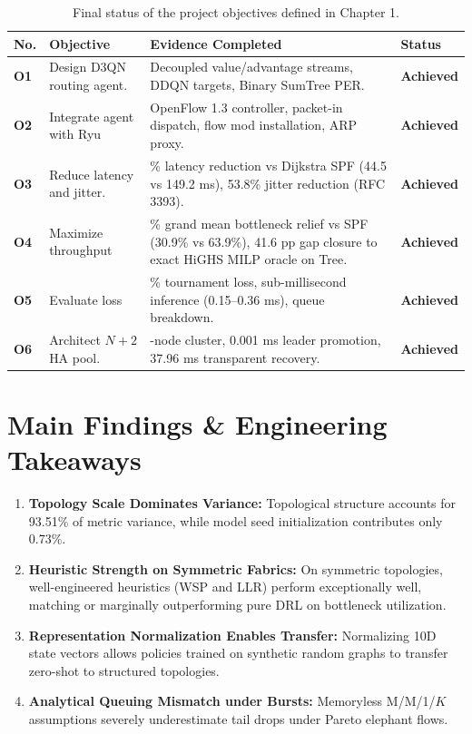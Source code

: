 \documentclass[12pt,a4paper,oneside]{report}
\begin{document}
\begin{table}[htbp]
\centering
\small
\caption{Final status of the project objectives defined in Chapter 1.}
\label{tab:objectives_status}
\begin{tabularx}{\textwidth}{>{\bfseries}p{10mm}>{\raggedright\arraybackslash}p{48mm}>{\raggedright\arraybackslash}X>{\bfseries}p{18mm}}
\toprule
No. & Objective & Evidence Completed & Status \\
\midrule
O1 & Design D3QN routing agent. & Decoupled value/advantage streams, DDQN targets, Binary SumTree PER. & Achieved \\
O2 & Integrate agent with Ryu & OpenFlow 1.3 controller, packet-in dispatch, flow mod installation, ARP proxy. & Achieved \\
O3 & Reduce latency and jitter. & 70.2\% latency reduction vs Dijkstra SPF (44.5 vs 149.2 ms), 53.8\% jitter reduction (RFC 3393). & Achieved \\
O4 & Maximize throughput & 51.7\% grand mean bottleneck relief vs SPF (30.9\% vs 63.9\%), 41.6 pp gap closure to exact HiGHS MILP oracle on Tree. & Achieved \\
O5 & Evaluate loss & 0.00\% tournament loss, sub-millisecond inference (0.15--0.36 ms), queue breakdown. & Achieved \\
O6 & Architect $N+2$ HA pool. & 3-node cluster, 0.001 ms leader promotion, 37.96 ms transparent recovery. & Achieved \\
\bottomrule
\end{tabularx}
\end{table}

\section{Main Findings \& Engineering Takeaways}
\begin{enumerate}
  \item \textbf{Topology Scale Dominates Variance:} Topological structure accounts for 93.51\% of metric variance, while model seed initialization contributes only 0.73\%.
  \item \textbf{Heuristic Strength on Symmetric Fabrics:} On symmetric topologies, well-engineered heuristics (WSP and LLR) perform exceptionally well, matching or marginally outperforming pure DRL on bottleneck utilization.
  \item \textbf{Representation Normalization Enables Transfer:} Normalizing 10D state vectors allows policies trained on synthetic random graphs to transfer zero-shot to structured topologies.
  \item \textbf{Analytical Queuing Mismatch under Bursts:} Memoryless M/M/1/$K$ assumptions severely underestimate tail drops under Pareto elephant flows.
\end{enumerate}
\end{document}
